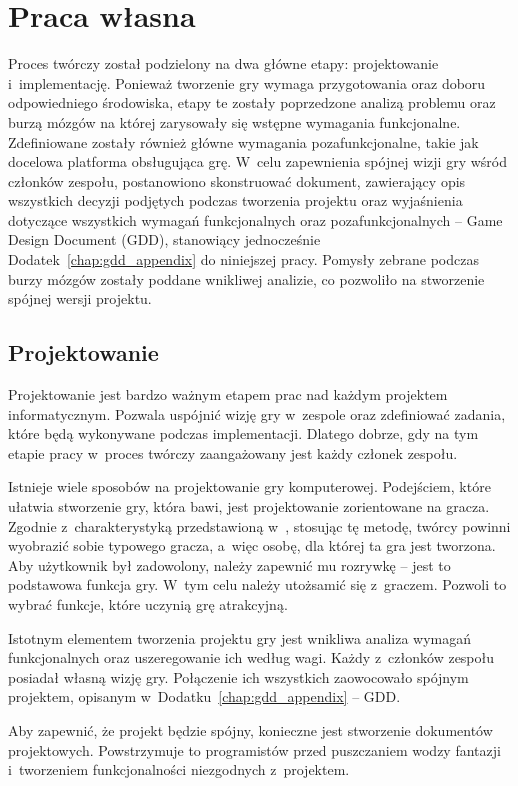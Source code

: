 \chapter{Praca własna}
Proces twórczy został podzielony na dwa główne etapy: projektowanie i~implementację. Ponieważ tworzenie gry wymaga przygotowania oraz doboru odpowiedniego środowiska, etapy te zostały poprzedzone analizą problemu oraz burzą mózgów na której zarysowały się wstępne wymagania funkcjonalne. Zdefiniowane zostały również główne wymagania pozafunkcjonalne, takie jak docelowa platforma obsługująca grę. W~celu zapewnienia spójnej wizji gry wśród członków zespołu, postanowiono skonstruować dokument, zawierający opis wszystkich decyzji podjętych podczas tworzenia projektu oraz wyjaśnienia dotyczące wszystkich wymagań funkcjonalnych oraz pozafunkcjonalnych -- Game Design Document (GDD), stanowiący jednocześnie Dodatek~\ref{chap:gdd_appendix} do niniejszej pracy.  Pomysły zebrane podczas burzy mózgów zostały poddane wnikliwej analizie, co pozwoliło na stworzenie spójnej wersji projektu. 

\section{Projektowanie}
Projektowanie jest bardzo ważnym etapem prac nad każdym projektem informatycznym. Pozwala uspójnić wizję gry w~zespole oraz zdefiniować zadania, które będą wykonywane podczas implementacji. Dlatego dobrze, gdy na tym etapie pracy w~proces twórczy zaangażowany jest każdy członek zespołu. 

Istnieje wiele sposobów na projektowanie gry komputerowej. Podejściem, które ułatwia stworzenie gry, która bawi, jest projektowanie zorientowane na gracza. Zgodnie z~charakterystyką przedstawioną w~\cite{Adams:pgp}, stosując tę metodę, twórcy powinni wyobrazić sobie typowego gracza, a~więc osobę, dla której ta gra jest tworzona. Aby użytkownik był zadowolony, należy zapewnić mu rozrywkę -- jest to podstawowa funkcja gry. W~tym celu należy utożsamić się z~graczem. Pozwoli to wybrać funkcje, które uczynią grę atrakcyjną.

Istotnym elementem tworzenia projektu gry jest wnikliwa analiza wymagań funkcjonalnych oraz uszeregowanie ich według wagi. Każdy z~członków zespołu posiadał własną wizję gry. Połączenie ich wszystkich zaowocowało spójnym projektem, opisanym w~Dodatku~\ref{chap:gdd_appendix} -- GDD. 

Aby zapewnić, że projekt będzie spójny, konieczne jest stworzenie dokumentów projektowych. Powstrzymuje to programistów przed puszczaniem wodzy fantazji i~tworzeniem funkcjonalności niezgodnych z~projektem. 

